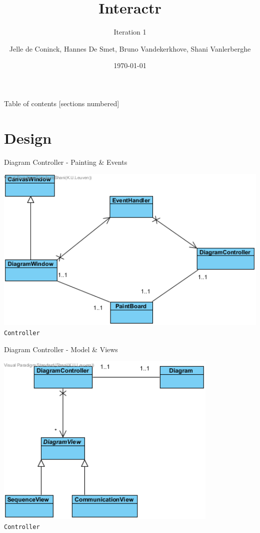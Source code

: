 \documentclass[10pt]{beamer}
\title{Interactr}
\subtitle{Iteration 1}
\date{\today}
\author{Jelle de Coninck, Hannes De Smet, Bruno Vandekerkhove, Shani Vanlerberghe}
\institute{KULeuven}
\begin{document}
\maketitle

\begin{frame}{Table of contents}
  [sections numbered]
  \tableofcontents[hideallsubsections]
\end{frame}

\section{Design}

\begin{frame}[fragile]{Diagram Controller - Painting \& Events}
\begin{center}
\includegraphics[width=1\textwidth]{diagram1}
\vspace{0.5cm}\\\texttt{Controller}
\end{center}
\end{frame}

\begin{frame}[fragile]{Diagram Controller - Model \& Views}
\begin{center}
\includegraphics[width=0.8\textwidth]{diagram2}
\vspace{0.5cm}\\\texttt{Controller}
\end{center}
\end{frame}
\end{document}
